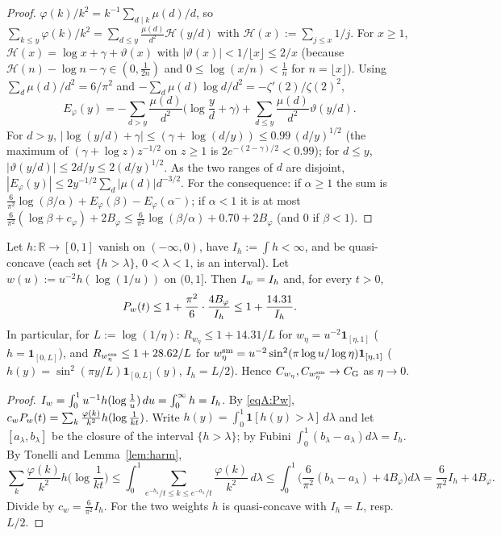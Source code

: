 \begin{proof}
$\varphi(k)/k^2=k^{-1}\sum_{d\mid k}\mu(d)/d$, so $\sum_{k\le y}\varphi(k)/k^2=\sum_{d\le y}\frac{\mu(d)}{d^2}\mathcal H(y/d)$ with
$\mathcal H(x):=\sum_{j\le x}1/j$. For $x\ge1$, $\mathcal H(x)=\log x+\gamma+\vartheta(x)$ with $|\vartheta(x)|<1/\lfloor x\rfloor\le2/x$
(because $\mathcal H(n)-\log n-\gamma\in(0,\frac1{2n})$ and $0\le\log(x/n)<\frac1n$ for $n=\lfloor x\rfloor$). Using
$\sum_d\mu(d)/d^2=6/\pi^2$ and $-\sum_d\mu(d)\log d/d^2=-\zeta'(2)/\zeta(2)^2$,
\[
 E_\varphi(y)=-\sum_{d>y}\frac{\mu(d)}{d^2}\Big(\log\frac yd+\gamma\Big)+\sum_{d\le y}\frac{\mu(d)}{d^2}\vartheta(y/d).
\]
For $d>y$, $|\log(y/d)+\gamma|\le(\gamma+\log(d/y))\le0.99\,(d/y)^{1/2}$ (the maximum of $(\gamma+\log z)z^{-1/2}$ on $z\ge1$ is
$2e^{-(2-\gamma)/2}<0.99$); for $d\le y$, $|\vartheta(y/d)|\le 2d/y\le 2(d/y)^{1/2}$. As the two ranges of $d$ are disjoint,
$|E_\varphi(y)|\le2y^{-1/2}\sum_d|\mu(d)|d^{-3/2}$. For the consequence: if $\alpha\ge1$ the sum is
$\frac6{\pi^2}\log(\beta/\alpha)+E_\varphi(\beta)-E_\varphi(\alpha^-)$; if $\alpha<1$ it is at most
$\frac6{\pi^2}(\log\beta+c_\varphi)+2B_\varphi\le\frac6{\pi^2}\log(\beta/\alpha)+0.70+2B_\varphi$ (and $0$ if $\beta<1$).
\end{proof}

\begin{lemma}\label{lem:Rwlog}
Let $h:\mathbb R\to[0,1]$ vanish on $(-\infty,0)$, have $I_h:=\int h<\infty$, and be quasi-concave (each set $\{h>\lambda\}$,
$0<\lambda<1$, is an interval). Let $w(u):=u^{-2}h(\log(1/u))$ on $(0,1]$. Then $I_w=I_h$ and, for every $t>0$,
\[
 P_w(t)\le1+\frac{\pi^2}{6}\cdot\frac{4B_\varphi}{I_h}\le1+\frac{14.31}{I_h}.
\]
In particular, for $L:=\log(1/\eta)$: $R_{w_\eta}\le1+14.31/L$ for $w_\eta=u^{-2}\mathbf 1_{[\eta,1]}$ ($h=\mathbf 1_{[0,L]}$), and
$R_{w^{\rm sm}_\eta}\le1+28.62/L$ for $w^{\rm sm}_\eta=u^{-2}\sin^2(\pi\log u/\log\eta)\mathbf 1_{[\eta,1]}$
($h(y)=\sin^2(\pi y/L)\mathbf 1_{[0,L]}(y)$, $I_h=L/2$). Hence $C_{w_\eta},C_{w^{\rm sm}_\eta}\to C_{\mathrm G}$ as $\eta\to0$.
\end{lemma}

\begin{proof}
$I_w=\int_0^1u^{-1}h(\log\frac1u)\,du=\int_0^\infty h=I_h$. By \eqref{eqA:Pw}, $c_wP_w(t)=\sum_k\frac{\varphi(k)}{k^2}h(\log\frac1{kt})$.
Write $h(y)=\int_0^1\mathbf 1[h(y)>\lambda]\,d\lambda$ and let $[a_\lambda,b_\lambda]$ be the closure of the interval $\{h>\lambda\}$; by
Fubini $\int_0^1(b_\lambda-a_\lambda)d\lambda=I_h$. By Tonelli and Lemma~\ref{lem:harm},
\[
 \sum_k\frac{\varphi(k)}{k^2}h\Big(\log\frac1{kt}\Big)\le\int_0^1\sum_{e^{-b_\lambda}/t\le k\le e^{-a_\lambda}/t}\frac{\varphi(k)}{k^2}\,d\lambda
 \le\int_0^1\Big(\frac6{\pi^2}(b_\lambda-a_\lambda)+4B_\varphi\Big)d\lambda=\frac6{\pi^2}I_h+4B_\varphi .
\]
Divide by $c_w=\frac6{\pi^2}I_h$. For the two weights $h$ is quasi-concave with $I_h=L$, resp.\ $L/2$.
\end{proof}

